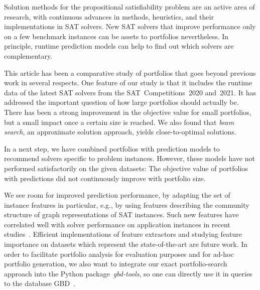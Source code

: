 \documentclass[runningheads]{llncs}
\begin{document}
Solution methods for the propositional satisfiability problem are an active area of research, with continuous advances in methods, heuristics, and their implementations in SAT solvers. 
New SAT solvers that improve performance only on a few benchmark instances can be assets to portfolios nevertheless. 
In principle, runtime prediction models can help to find out which solvers are complementary. 

This article has been a comparative study of portfolios that goes beyond previous work in several respects.
One feature of our study is that it includes the runtime data of the latest SAT solvers from the SAT~Competitions~2020 and~2021. 
It has addressed the important question of how large portfolios should actually be.
There has been a strong improvement in the objective value for small portfolios, but a small impact once a certain size is reached. 
We also found that \emph{beam search}, an approximate solution approach, yields close-to-optimal solutions.

In a next step, we have combined portfolios with prediction models to recommend solvers specific to problem instances.
However, these models have not performed satisfactorily on the given datasets:
The objective value of portfolios with predictions did not continuously improve with portfolio size.

We see room for improved prediction performance, by adapting the set of instance features in particular,
e.g., by using features describing the community structure of graph representations of SAT instances.
Such new features have correlated well with solver performance on application instances in recent studies~\cite{Ansotegui:2009:StructureIndustrial,Ansotegui:2017:StructureFeatures,Ansotegui:2019:CommunityStructure,Li:2021:HCS}. 
Efficient implementations of feature extractors and studying feature importance on datasets which represent the state-of-the-art are future work. 
In order to facilitate portfolio analysis for evaluation purposes and for ad-hoc portfolio generation, we also want to integrate our exact portfolio-search approach into the Python package~\emph{gbd-tools}, so one can directly use it in queries to the database GBD~\cite{iser2020collaborative}. 



\end{document}

